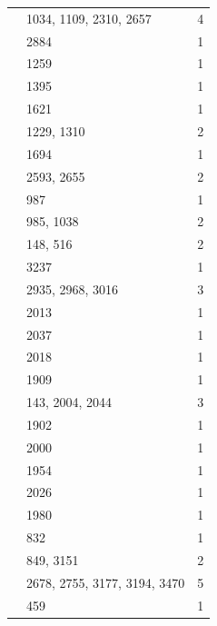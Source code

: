 \begin{longtable}{@{}p{}p{}p{}@{}}
\cite[Theorem~21.14]{CabanesEnguehard2004} & 1034, 1109, 2310, 2657 & 4 \\
\cite[Theorem~9.12]{CabanesEnguehard2004} & 2884 & 1 \\
\cite[Section~2.3]{CabanesSpath2013} & 1259 & 1 \\
\cite[Theorem~2.8]{CabanesSpath2013} & 1395 & 1 \\
\cite[Theorem~3.1]{CabanesSpath2013} & 1621 & 1 \\
\cite[p.~700]{CabanesSpath2013} & 1229, 1310 & 2 \\
\cite[Theorem~3.1]{CabanesSpath2017TypeC} & 1694 & 1 \\
\cite[Proposition~2.7]{Chaneb2021} & 2593, 2655 & 2 \\
\cite[Proposition~2.8]{Chaneb2021} & 987 & 1 \\
\cite[Theorem~2.9]{Chaneb2021} & 985, 1038 & 2 \\
\cite{Conlon1968} & 148, 516 & 2 \\
\cite[Table~1]{Atlas1985} & 3237 & 1 \\
\cite[Theorem~8.1]{FengLiZhang2021Equivariant} & 2935, 2968, 3016 & 3 \\
\cite[Proposition~7.2]{FengLiZhang2022TypeB} & 2013 & 1 \\
\cite[Proposition~7.5]{FengLiZhang2022TypeB} & 2037 & 1 \\
\cite[Remark~2.2]{FengLiZhang2022TypeB} & 2018 & 1 \\
\cite[Section~3.1]{FengLiZhang2022TypeB} & 1909 & 1 \\
\cite[Theorem~1]{FengLiZhang2022TypeB} & 143, 2004, 2044 & 3 \\
\cite[Theorem~1 and Assumption~3.11]{FengLiZhang2022TypeB} & 1902 & 1 \\
\cite[Theorem~2.1]{FengLiZhang2022TypeB} & 2000 & 1 \\
\cite[Theorem~2.3]{FengLiZhang2022TypeB} & 1954 & 1 \\
\cite[Theorem~3.10]{FengLiZhang2022TypeB} & 2026 & 1 \\
\cite[proof of Lemma~5.16]{FengLiZhang2022TypeB} & 1980 & 1 \\
\cite{FengLiZhang2023LowRankA} & 832 & 1 \\
\cite[Proposition~4.6]{FengLiZhang2023LowRankA} & 849, 3151 & 2 \\
\cite[Corollary~2.13]{FengLiZhang2019} & 2678, 2755, 3177, 3194, 3470 & 5 \\
\cite[Lemma~2.1]{FengLiZhang2019} & 459 & 1 \\

\end{longtable}
